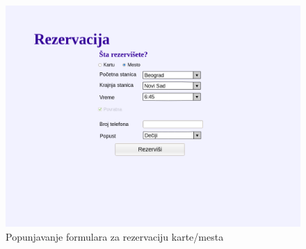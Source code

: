 \begin{description}
\begin{figure}[h!tb] 
	\centering
	\includegraphics[width=1.2\linewidth]{../Slike/Veb/rezervacija.png}
	\caption{Popunjavanje formulara za rezervaciju karte/mesta}
	\label{fig:pocetna}
\end{figure}


\end{description}


\newpage
